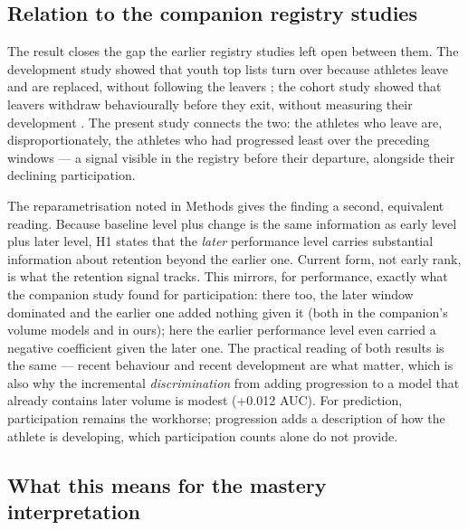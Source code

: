\documentclass[12pt,a4paper]{article}
\begin{document}
\subsection{Relation to the companion registry studies}

The result closes the gap the earlier registry studies left open between them. The development study showed that youth top lists turn over because athletes leave and are replaced, without following the leavers \cite{guttormsen2026development}; the cohort study showed that leavers withdraw behaviourally before they exit, without measuring their development \cite{guttormsen2026dropout}. The present study connects the two: the athletes who leave are, disproportionately, the athletes who had progressed least over the preceding windows --- a signal visible in the registry before their departure, alongside their declining participation.

The reparametrisation noted in Methods gives the finding a second, equivalent reading. Because baseline level plus change is the same information as early level plus later level, H1 states that the \emph{later} performance level carries substantial information about retention beyond the earlier one. Current form, not early rank, is what the retention signal tracks. This mirrors, for performance, exactly what the companion study found for participation: there too, the later window dominated and the earlier one added nothing given it (both in the companion's volume models and in ours); here the earlier performance level even carried a negative coefficient given the later one. The practical reading of both results is the same --- recent behaviour and recent development are what matter, which is also why the incremental \emph{discrimination} from adding progression to a model that already contains later volume is modest (+0.012 AUC). For prediction, participation remains the workhorse; progression adds a description of how the athlete is developing, which participation counts alone do not provide.

\subsection{What this means for the mastery interpretation}
\end{document}
